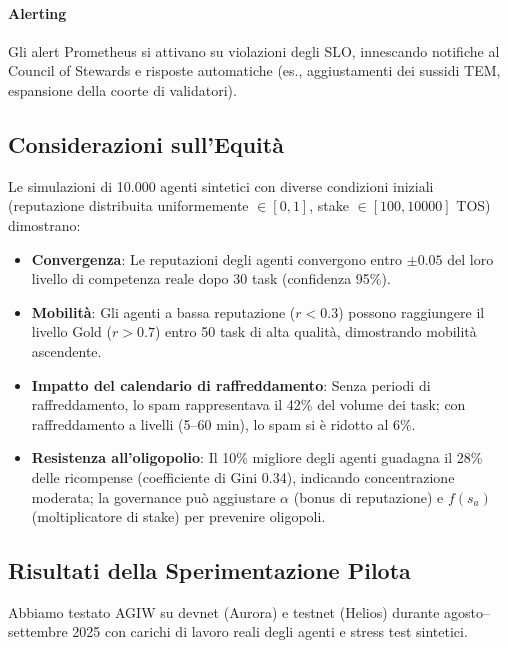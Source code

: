 \documentclass[11pt]{article}
\begin{document}
\paragraph{Alerting} Gli alert Prometheus si attivano su violazioni degli SLO, innescando notifiche al Council of Stewards e risposte automatiche (es., aggiustamenti dei sussidi TEM, espansione della coorte di validatori).

\subsection{Considerazioni sull'Equità}
Le simulazioni di 10.000 agenti sintetici con diverse condizioni iniziali (reputazione distribuita uniformemente $\in [0,1]$, stake $\in [100, 10000]$ TOS) dimostrano:
\begin{itemize}[noitemsep]
  \item \textbf{Convergenza}: Le reputazioni degli agenti convergono entro $\pm0.05$ del loro livello di competenza reale dopo 30 task (confidenza 95\%).
  \item \textbf{Mobilità}: Gli agenti a bassa reputazione ($r<0.3$) possono raggiungere il livello Gold ($r>0.7$) entro 50 task di alta qualità, dimostrando mobilità ascendente.
  \item \textbf{Impatto del calendario di raffreddamento}: Senza periodi di raffreddamento, lo spam rappresentava il 42\% del volume dei task; con raffreddamento a livelli (5--60 min), lo spam si è ridotto al 6\%.
  \item \textbf{Resistenza all'oligopolio}: Il 10\% migliore degli agenti guadagna il 28\% delle ricompense (coefficiente di Gini 0.34), indicando concentrazione moderata; la governance può aggiustare $\alpha$ (bonus di reputazione) e $f(s_a)$ (moltiplicatore di stake) per prevenire oligopoli.
\end{itemize}

\subsection{Risultati della Sperimentazione Pilota}
\label{sec:pilot-results}
Abbiamo testato AGIW su devnet (Aurora) e testnet (Helios) durante agosto--settembre 2025 con carichi di lavoro reali degli agenti e stress test sintetici.
\end{document}
